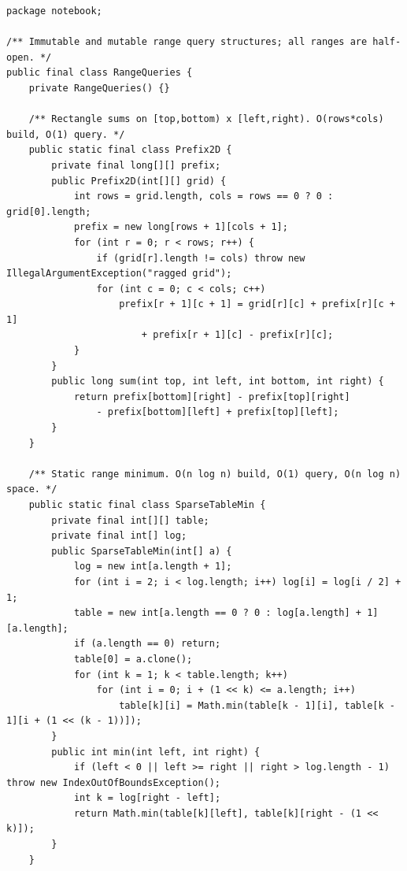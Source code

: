 \documentclass[10pt,letterpaper]{article}
\begin{document}
\begin{lstlisting}
package notebook;

/** Immutable and mutable range query structures; all ranges are half-open. */
public final class RangeQueries {
    private RangeQueries() {}

    /** Rectangle sums on [top,bottom) x [left,right). O(rows*cols) build, O(1) query. */
    public static final class Prefix2D {
        private final long[][] prefix;
        public Prefix2D(int[][] grid) {
            int rows = grid.length, cols = rows == 0 ? 0 : grid[0].length;
            prefix = new long[rows + 1][cols + 1];
            for (int r = 0; r < rows; r++) {
                if (grid[r].length != cols) throw new IllegalArgumentException("ragged grid");
                for (int c = 0; c < cols; c++)
                    prefix[r + 1][c + 1] = grid[r][c] + prefix[r][c + 1]
                        + prefix[r + 1][c] - prefix[r][c];
            }
        }
        public long sum(int top, int left, int bottom, int right) {
            return prefix[bottom][right] - prefix[top][right]
                - prefix[bottom][left] + prefix[top][left];
        }
    }

    /** Static range minimum. O(n log n) build, O(1) query, O(n log n) space. */
    public static final class SparseTableMin {
        private final int[][] table;
        private final int[] log;
        public SparseTableMin(int[] a) {
            log = new int[a.length + 1];
            for (int i = 2; i < log.length; i++) log[i] = log[i / 2] + 1;
            table = new int[a.length == 0 ? 0 : log[a.length] + 1][a.length];
            if (a.length == 0) return;
            table[0] = a.clone();
            for (int k = 1; k < table.length; k++)
                for (int i = 0; i + (1 << k) <= a.length; i++)
                    table[k][i] = Math.min(table[k - 1][i], table[k - 1][i + (1 << (k - 1))]);
        }
        public int min(int left, int right) {
            if (left < 0 || left >= right || right > log.length - 1) throw new IndexOutOfBoundsException();
            int k = log[right - left];
            return Math.min(table[k][left], table[k][right - (1 << k)]);
        }
    }


\end{lstlisting}
\end{document}
